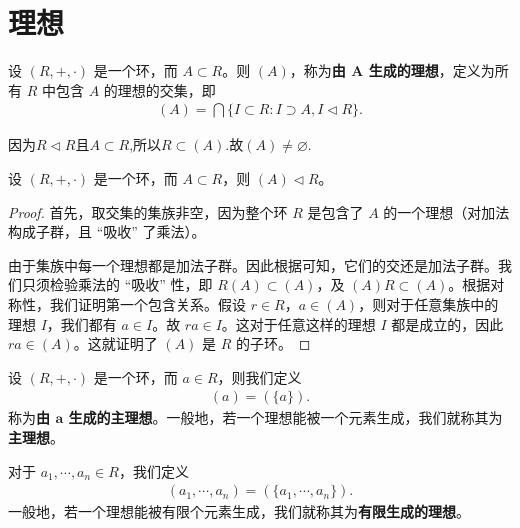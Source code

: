 \documentclass[../../main.tex]{subfiles}
\begin{document}
\section{理想}

\begin{definition}[由子集生成的理想]
设 $(R, +, \cdot)$ 是一个环，而 $A \subset R$。则 $(A)$，称为\textbf{由 $\boldsymbol{A}$ 生成的理想}，定义为所有 $R$ 中包含 $A$ 的理想的交集，即
\begin{align*}
(A) = \bigcap \{I \subset R : I \supset A, I \lhd R\}.
\end{align*} 
\end{definition}
\begin{note}
因为$R\lhd R$且$A\subset R$,所以$R\subset (A)$.故$(A)\ne \varnothing.$
\end{note}

\begin{proposition}[生成的理想还是理想]\label{proposition:由子集生成的理想还是理想}
设 $(R, +, \cdot)$ 是一个环，而 $A \subset R$，则 $(A) \lhd R$。
\end{proposition}
\begin{proof}
 首先，取交集的集族非空，因为整个环 $R$ 是包含了 $A$ 的一个理想（对加法构成子群，且 “吸收” 了乘法）。

由于集族中每一个理想都是加法子群。因此根据可知，它们的交还是加法子群。我们只须检验乘法的 “吸收” 性，即 $R(A) \subset (A)$，及 $(A)R \subset (A)$。根据对称性，我们证明第一个包含关系。假设 $r \in R$，$a \in (A)$，则对于任意集族中的理想 $I$，我们都有 $a \in I$。故 $ra \in I$。这对于任意这样的理想 $I$ 都是成立的，因此 $ra \in (A)$。这就证明了 $(A)$ 是 $R$ 的子环。 

\end{proof}

\begin{definition}
设 $(R, +, \cdot)$ 是一个环，而 $a \in R$，则我们定义
\begin{align*}
(a) = (\{a\}).
\end{align*}
称为\textbf{由 $\boldsymbol{a}$ 生成的主理想}。一般地，若一个理想能被一个元素生成，我们就称其为\textbf{主理想}。

对于 $a_1, \cdots, a_n \in R$，我们定义
\begin{align*}
(a_1, \cdots, a_n) = (\{a_1, \cdots, a_n\}).
\end{align*}
一般地，若一个理想能被有限个元素生成，我们就称其为\textbf{有限生成的理想}。 
\end{definition}
\end{document}
